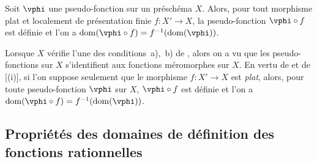 \begin{corollary}[20.3.12]
\label{IV.20.3.12}
Soit $\vphi$ une pseudo-fonction sur un préschéma $X$.
Alors, pour tout morphisme plat et localement de présentation finie $f:X'\to X$, la pseudo-fonction $\vphi\circ f$ est définie et l'on a $\operatorname{dom}(\vphi\circ f)=f^{-1}(\operatorname{dom}(\vphi))$.
\end{corollary}

\begin{remark}[20.3.13]
\label{IV.20.3.13}
Lorsque $X$ vérifie l'une des conditions~a),~b) de , alors on a vu  que les pseudo-fonctions sur $X$ s'identifient aux fonctions méromorphes sur $X$.
En vertu de  et de [(i)], si l'on suppose seulement que le morphisme $f:X'\to X$ est \emph{plat}, alors, pour toute pseudo-fonction $\vphi$ sur $X$, $\vphi\circ f$ est définie et l'on a $\operatorname{dom}(\vphi\circ f)=f^{-1}(\operatorname{dom}(\vphi))$.
\end{remark}

\subsection{Propriétés des domaines de définition des fonctions rationnelles}

